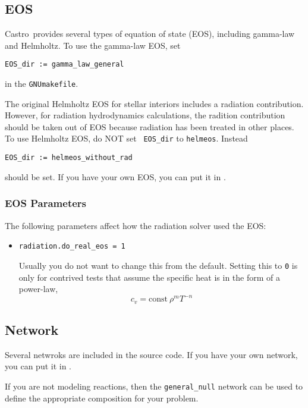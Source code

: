 \documentclass[11pt,letterpaper]{article}
\newcommand{\castro}{{\sf Castro}}
\begin{document}
\subsection{EOS}

\castro\ provides several types of equation of state (EOS), including
gamma-law and Helmholtz.  To use the gamma-law EOS, set
\begin{verbatim}
EOS_dir := gamma_law_general
\end{verbatim}
in the {\tt GNUmakefile}.

The original Helmholtz EOS for stellar interiors includes a radiation
contribution.  However, for radiation hydrodynamics calculations, the
radition contribution should be taken out of EOS because radiation has
been treated in other places.  To use Helmholtz EOS, do NOT set {\tt
  EOS\_dir} to {\tt helmeos}.  Instead
\begin{verbatim}
EOS_dir := helmeos_without_rad
\end{verbatim}
should be set.  If you have your own EOS, you can put it in
{\tt{}}.

\subsubsection{EOS Parameters}

The following parameters affect how the radiation solver used the EOS:
\begin{itemize}
  \item {\tt radiation.do\_real\_eos = 1}

    Usually you do not want to change this from the default.  Setting
    this to {\tt 0} is only for contrived tests that assume the
    specific heat is in the form of a power-law,
    \begin{equation}
      c_v = \mathrm{const}\ \rho^m T^{-n}
    \end{equation}

\end{itemize}
  
  

\subsection{Network}

Several netwroks are included in the source code.  If you have your
own network, you can put it in
{\tt{}}.

If you are not modeling reactions, then the {\tt general\_null}
network can be used to define the appropriate composition for
your problem.
\end{document}
